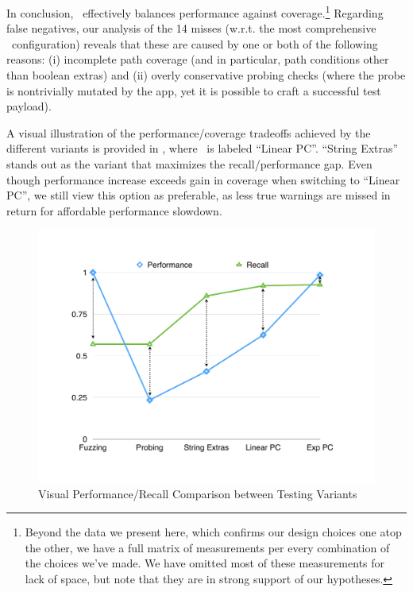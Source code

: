  In conclusion, \Tool\ effectively balances performance against coverage.\footnote{
	Beyond the data we present here, which confirms our design choices one atop the other, we have a full matrix of measurements per every combination of the choices we've made. We have omitted most of these measurements for lack of space, but note that they are in strong support of our hypotheses.
} Regarding false negatives, our analysis of the 14 misses (w.r.t. the most comprehensive \Tool\ configuration) reveals that these are caused by one or both of the following reasons: (i) incomplete path coverage (and in particular, path conditions other than boolean extras) and (ii) overly conservative probing checks (where the probe is nontrivially mutated by the app, yet it is possible to craft a successful test payload).

A visual illustration of the performance/coverage tradeoffs achieved by the different variants is provided in , where \Tool\ is labeled ``Linear PC''.
%
``String Extras'' stands out as the variant that maximizes the recall/performance gap. Even though performance increase exceeds gain in coverage when switching to ``Linear PC'', we still view this option as preferable, as less true warnings are missed in return for affordable performance slowdown.

\begin{figure}
	\includegraphics[width=\columnwidth]{trendline.pdf}
	\caption{\label{Fi:trends}Visual Performance/Recall Comparison between Testing Variants}
\end{figure}



